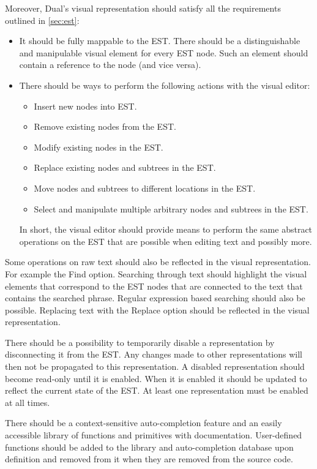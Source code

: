 Moreover, Dual's visual representation should satisfy all the requirements outlined in \ref{sec:est}:
\begin{itemize}
\item It should be fully mappable to the EST. There should be a distinguishable and manipulable visual element for every EST node. Such an element should contain a reference to the node (and vice versa).

\item There should be ways to perform the following actions with the visual editor:
    \begin{itemize}
    \item Insert new nodes into EST.
    \item Remove existing nodes from the EST.
    \item Modify existing nodes in the EST.
    \item Replace existing nodes and subtrees in the EST.
    \item Move nodes and subtrees to different locations in the EST.
    \item Select and manipulate multiple arbitrary nodes and subtrees in the EST.
    \end{itemize}
    
In short, the visual editor should provide means to perform the same abstract operations on the EST that are possible when editing text and possibly more.
\end{itemize}

Some operations on raw text should also be reflected in the visual representation. For example the Find option. Searching through text should highlight the visual elements that correspond to the EST nodes that are connected to the text that contains the searched phrase. Regular expression based searching should also be possible. Replacing text with the Replace option should be reflected in the visual representation.

There should be a possibility to temporarily disable a representation by disconnecting it from the EST. Any changes made to other representations will then not be propagated to this representation. A disabled representation should become read-only until it is enabled. When it is enabled it should be updated to reflect the current state of the EST. At least one representation must be enabled at all times.

There should be a context-sensitive auto-completion feature and an easily accessible library of functions and primitives with documentation. User-defined functions should be added to the library and auto-completion database upon definition and removed from it when they are removed from the source code.

